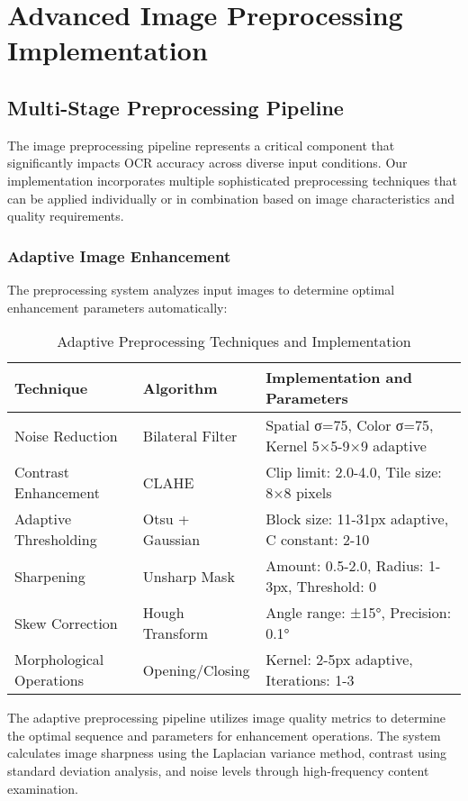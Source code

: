 \section{Advanced Image Preprocessing Implementation}

\subsection{Multi-Stage Preprocessing Pipeline}

The image preprocessing pipeline represents a critical component that significantly impacts OCR accuracy across diverse input conditions. Our implementation incorporates multiple sophisticated preprocessing techniques that can be applied individually or in combination based on image characteristics and quality requirements.

\subsubsection{Adaptive Image Enhancement}

The preprocessing system analyzes input images to determine optimal enhancement parameters automatically:

\begin{table}[H]
\centering
\caption{Adaptive Preprocessing Techniques and Implementation}
\label{tab:preprocessing_adaptive}
\begin{tabular}{|l|l|p{5.5cm}|}
\hline
\textbf{Technique} & \textbf{Algorithm} & \textbf{Implementation and Parameters} \\
\hline
Noise Reduction & Bilateral Filter & Spatial σ=75, Color σ=75, Kernel 5×5-9×9 adaptive \\
\hline
Contrast Enhancement & CLAHE & Clip limit: 2.0-4.0, Tile size: 8×8 pixels \\
\hline
Adaptive Thresholding & Otsu + Gaussian & Block size: 11-31px adaptive, C constant: 2-10 \\
\hline
Sharpening & Unsharp Mask & Amount: 0.5-2.0, Radius: 1-3px, Threshold: 0 \\
\hline
Skew Correction & Hough Transform & Angle range: ±15°, Precision: 0.1° \\
\hline
Morphological Operations & Opening/Closing & Kernel: 2-5px adaptive, Iterations: 1-3 \\
\hline
\end{tabular}
\end{table}

The adaptive preprocessing pipeline utilizes image quality metrics to determine the optimal sequence and parameters for enhancement operations. The system calculates image sharpness using the Laplacian variance method, contrast using standard deviation analysis, and noise levels through high-frequency content examination.

